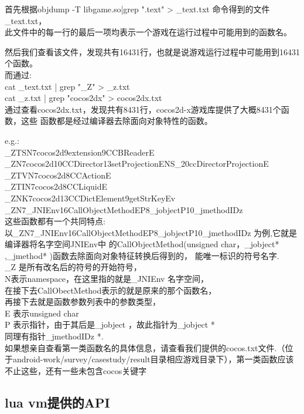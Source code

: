 首先根据objdump -T libgame.so|grep ".text" > \_text.txt 命令得到的文件\_text.txt，\\
此文件中的每一行的最后一项均表示一个游戏在运行过程中可能用到的函数名。

然后我们查看该文件，发现共有16431行，也就是说游戏运行过程中可能用到16431个函数。\\
而通过:\\
cat \_text.txt | grep  "\_Z" > \_z.txt\\
cat \_z.txt | grep "cocos2dx" > cocos2dx.txt\\
通过查看cocos2dx.txt，发现共有8431行，cocos2d-x游戏库提供了大概8431个函数，这些
函数都是经过编译器去除面向对象特性的函数。
 
e.g.:\\
      \_ZTSN7cocos2d9extension9CCBReaderE\\
      \_ZN7cocos2d10CCDirector13setProjectionENS\_20ccDirectorProjectionE\\
      \_ZTVN7cocos2d8CCActionE\\
      \_ZTIN7cocos2d8CCLiquidE\\
      \_ZNK7cocos2d13CCDictElement9getStrKeyEv\\
      \_ZN7\_JNIEnv16CallObjectMethodEP8\_jobjectP10\_jmethodIDz\\
这些函数都有一个共同特点:\\
以\_ZN7\_JNIEnv16CallObjectMethodEP8\_jobjectP10\_jmethodIDz 为例,它就是编译器将名字空间JNIEnv中
的CallObjectMethod(unsigned char，\_jobject* ,\_jmethod* )函数去除面向对象特征转换后得到的，
能唯一标识的符号名字.\\
\_Z 是所有改名后的符号的开始符号，\\
N表示namespace，在这里指的就是\_JNIEnv 名字空间，\\
在接下去CallObectMethod表示的就是原来的那个函数名，\\
再接下去就是函数参数列表中的参数类型，\\
E 表示unsigned char\\
P 表示指针，由于其后是\_jobject ，故此指针为\_jobject *\\
同理有指针\_jmethodIDz *.\\
	
如果想亲自查看第一类函数名的具体信息，请查看我们提供的cocos.txt文件.（位于android-work/survey/casestudy/result目录相应游戏目录下），第一类函数应该不止这些，还有一些未包含cocos关键字\\

\subsection{lua vm提供的API}
\label{sec:so:lualib}

